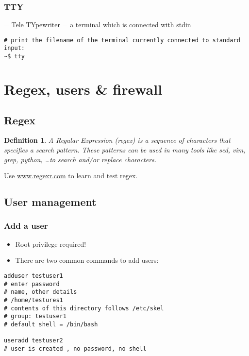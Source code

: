 \documentclass{article}
\newtheorem{theorem}{Definition}[section]
\begin{document}
\subsubsection{TTY}

= Tele TYpewriter
= a terminal which is connected with stdin

\begin{verbatim}
# print the filename of the terminal currently connected to standard input:
~$ tty
\end{verbatim}


\section{Regex, users \& firewall}

\subsection{Regex}

\begin{theorem}
    A Regular Expression (regex) is a sequence of characters that
    specifies a search pattern. These patterns can be used in 
    many tools like sed, vim, grep, python, \dots to search and/or replace characters.
\end{theorem}

Use \url{www.regexr.com} to learn and test regex.

\subsection{User management}

\subsubsection{Add a user}

\begin{itemize}
    \item Root privilege required!
    \item There are two common commands to add users:
\end{itemize}

\begin{verbatim}
adduser testuser1
# enter password
# name, other details
# /home/testures1
# contents of this directory follows /etc/skel
# group: testuser1
# default shell = /bin/bash

useradd testuser2
# user is created , no password, no shell
\end{verbatim}
\end{document}
